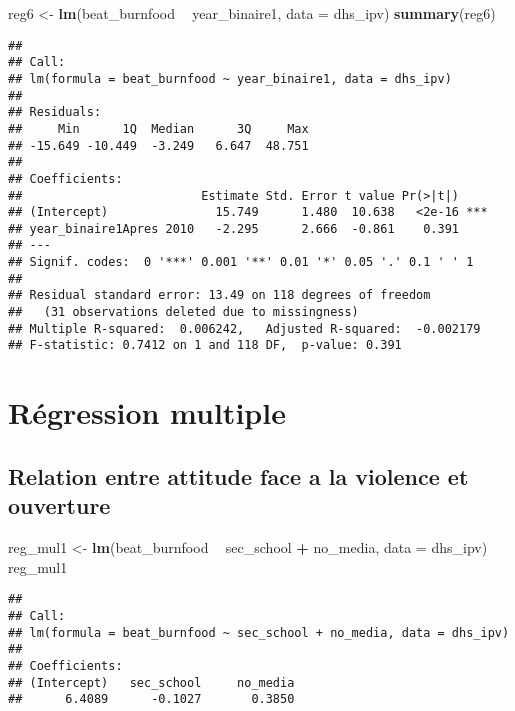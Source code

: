 \documentclass[
]{article}
\newenvironment{Shaded}{\begin{snugshade}}{\end{snugshade}}
\newcommand{\DataTypeTok}[1]{\textcolor[rgb]{0.13,0.29,0.53}{#1}}
\newcommand{\KeywordTok}[1]{\textcolor[rgb]{0.13,0.29,0.53}{\textbf{#1}}}
\newcommand{\NormalTok}[1]{#1}
\newcommand{\OperatorTok}[1]{\textcolor[rgb]{0.81,0.36,0.00}{\textbf{#1}}}
\newcommand{\StringTok}[1]{\textcolor[rgb]{0.31,0.60,0.02}{#1}}
\begin{document}
\begin{Shaded}
\begin{Highlighting}[]
\NormalTok{reg6 <-}\StringTok{ }\KeywordTok{lm}\NormalTok{(beat_burnfood }\OperatorTok{~}\StringTok{  }\NormalTok{year_binaire1, }\DataTypeTok{data =}\NormalTok{ dhs_ipv)}
\KeywordTok{summary}\NormalTok{(reg6)}
\end{Highlighting}
\end{Shaded}

\begin{verbatim}
## 
## Call:
## lm(formula = beat_burnfood ~ year_binaire1, data = dhs_ipv)
## 
## Residuals:
##     Min      1Q  Median      3Q     Max 
## -15.649 -10.449  -3.249   6.647  48.751 
## 
## Coefficients:
##                         Estimate Std. Error t value Pr(>|t|)    
## (Intercept)               15.749      1.480  10.638   <2e-16 ***
## year_binaire1Apres 2010   -2.295      2.666  -0.861    0.391    
## ---
## Signif. codes:  0 '***' 0.001 '**' 0.01 '*' 0.05 '.' 0.1 ' ' 1
## 
## Residual standard error: 13.49 on 118 degrees of freedom
##   (31 observations deleted due to missingness)
## Multiple R-squared:  0.006242,   Adjusted R-squared:  -0.002179 
## F-statistic: 0.7412 on 1 and 118 DF,  p-value: 0.391
\end{verbatim}

\hypertarget{ruxe9gression-multiple}{%
\section{Régression multiple}\label{ruxe9gression-multiple}}

\hypertarget{relation-entre-attitude-face-a-la-violence-et-ouverture}{%
\subsection{Relation entre attitude face a la violence et
ouverture}\label{relation-entre-attitude-face-a-la-violence-et-ouverture}}

\begin{Shaded}
\begin{Highlighting}[]
\NormalTok{reg_mul1 <-}\StringTok{ }\KeywordTok{lm}\NormalTok{(beat_burnfood }\OperatorTok{~}\StringTok{ }\NormalTok{sec_school }\OperatorTok{+}\StringTok{ }\NormalTok{no_media, }\DataTypeTok{data =}\NormalTok{ dhs_ipv)}
\NormalTok{reg_mul1}
\end{Highlighting}
\end{Shaded}

\begin{verbatim}
## 
## Call:
## lm(formula = beat_burnfood ~ sec_school + no_media, data = dhs_ipv)
## 
## Coefficients:
## (Intercept)   sec_school     no_media  
##      6.4089      -0.1027       0.3850
\end{verbatim}
\end{document}
